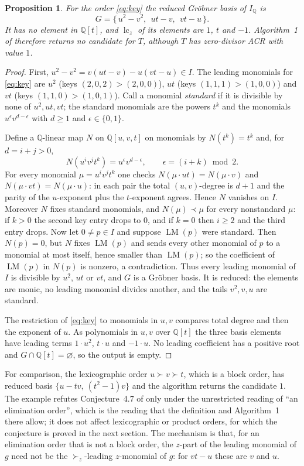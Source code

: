 \documentclass[11pt,a4paper]{article}
\theoremstyle{plain}
\newtheorem{proposition}[theorem]{Proposition}
\theoremstyle{definition}
\theoremstyle{remark}
\newcommand{\Q}{\mathbb{Q}}
\newcommand{\lc}{\operatorname{lc}}
\newcommand{\LM}{\operatorname{LM}}
\begin{document}
\begin{proposition}\label{prop:order}
For the order \eqref{eq:key} the reduced Gr\"obner basis of $I_\Q$ is
\[
  G=\{\,u^2-v^2,\ \ ut-v,\ \ vt-u\,\}.
\]
It has no element in $\Q[t]$, and $\lc_z$ of its elements are $1$, $t$ and $-1$. Algorithm~1 of \cite{acr} therefore returns no candidate for $T$, although $T$ has zero-divisor ACR with value $1$.
\end{proposition}
\begin{proof}
First, $u^2-v^2=v(ut-v)-u(vt-u)\in I$. The leading monomials for \eqref{eq:key} are $u^2$ (keys $(2,0,2)>(2,0,0)$), $ut$ (keys $(1,1,1)>(1,0,0)$) and $vt$ (keys $(1,1,0)>(1,0,1)$). Call a monomial \emph{standard} if it is divisible by none of $u^2,ut,vt$; the standard monomials are the powers $t^k$ and the monomials $u^\epsilon v^{d-\epsilon}$ with $d\ge1$ and $\epsilon\in\{0,1\}$.

Define a $\Q$-linear map $N$ on $\Q[u,v,t]$ on monomials by $N(t^k)=t^k$ and, for $d=i+j>0$,
\[
  N(u^iv^jt^k)=u^{\epsilon}v^{d-\epsilon},\qquad \epsilon=(i+k)\bmod 2 .
\]
For every monomial $\mu=u^iv^jt^k$ one checks $N(\mu\cdot ut)=N(\mu\cdot v)$ and $N(\mu\cdot vt)=N(\mu\cdot u)$: in each pair the total $(u,v)$-degree is $d+1$ and the parity of the $u$-exponent plus the $t$-exponent agrees. Hence $N$ vanishes on $I$. Moreover $N$ fixes standard monomials, and $N(\mu)\prec\mu$ for every nonstandard $\mu$: if $k>0$ the second key entry drops to $0$, and if $k=0$ then $i\ge2$ and the third entry drops. Now let $0\neq p\in I$ and suppose $\LM(p)$ were standard. Then $N(p)=0$, but $N$ fixes $\LM(p)$ and sends every other monomial of $p$ to a monomial at most itself, hence smaller than $\LM(p)$; so the coefficient of $\LM(p)$ in $N(p)$ is nonzero, a contradiction. Thus every leading monomial of $I$ is divisible by $u^2$, $ut$ or $vt$, and $G$ is a Gr\"obner basis. It is reduced: the elements are monic, no leading monomial divides another, and the tails $v^2,v,u$ are standard.

The restriction of \eqref{eq:key} to monomials in $u,v$ compares total degree and then the exponent of $u$. As polynomials in $u,v$ over $\Q[t]$ the three basis elements have leading terms $1\cdot u^2$, $t\cdot u$ and $-1\cdot u$. No leading coefficient has a positive root and $G\cap\Q[t]=\varnothing$, so the output is empty.
\end{proof}

For comparison, the lexicographic order $u\succ v\succ t$, which is a block order, has reduced basis $\{u-tv,\ (t^2-1)v\}$ and the algorithm returns the candidate $1$. The example refutes Conjecture~4.7 of \cite{acr} only under the unrestricted reading of ``an elimination order'', which is the reading that the definition and Algorithm~1 there allow; it does not affect lexicographic or product orders, for which the conjecture is proved in the next section. The mechanism is that, for an elimination order that is not a block order, the $z$-part of the leading monomial of $g$ need not be the $\succ_z$-leading $z$-monomial of $g$: for $vt-u$ these are $v$ and $u$.
\end{document}
